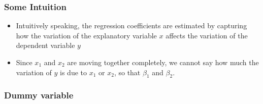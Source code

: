 \documentclass[]{book}
\providecommand{\tightlist}{%
  \setlength{\itemsep}{0pt}\setlength{\parskip}{0pt}}
\begin{document}
\subsubsection{Some Intuition}\label{some-intuition}

\begin{itemize}
\tightlist
\item
  Intuitively speaking, the regression coefficients are estimated by
  capturing how the variation of the explanatory variable \(x\) affects
  the variation of the dependent variable \(y\)
\item
  Since \(x_1\) and \(x_2\) are moving together completely, we cannot
  say how much the variation of \(y\) is due to \(x_1\) or \(x_2\), so
  that \(\beta_1\) and \(\beta_2\).
\end{itemize}

\subsubsection{Dummy variable}\label{dummy-variable-1}
\end{document}
